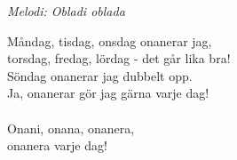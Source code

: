 {\footnotesize\textit{Melodi: Obladi oblada}}\par
\vspace{10pt}
Måndag, tisdag, onsdag onanerar jag,\\
torsdag, fredag, lördag - det går lika bra!\\
Söndag onanerar jag dubbelt opp.\\
Ja, onanerar gör jag gärna varje dag!\\
\\
\revrpt Onani, onana, onanera,\\
onanera varje dag!\rpt
